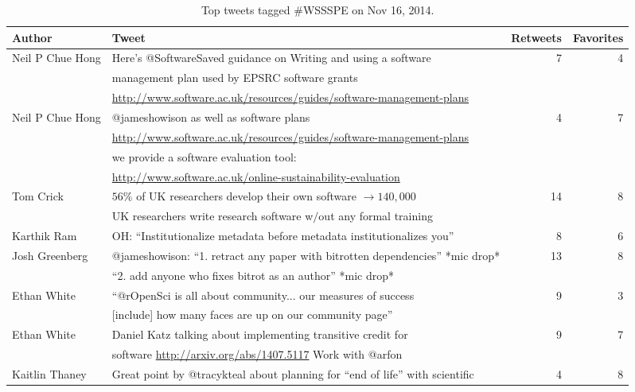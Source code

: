 \documentclass[11pt, oneside]{amsart}
\begin{document}
\begin{table*}[t]
\centering
\caption{Top tweets tagged \#WSSSPE on Nov 16, 2014.}\label{tab:tweets}
  \begin{scriptsize}
  \begin{tabular}{l|l|r|r}
 \hline
    Author  &   Tweet  & Retweets &  Favorites
\\ \hline
%
Neil P Chue Hong   &  Here's @SoftwareSaved guidance on Writing and using a software & 7 & 4
\\     &  management plan used by EPSRC software grants    &    &
\\     &  \url{http://www.software.ac.uk/resources/guides/software-management-plans}  &    &
%
\\  Neil P Chue Hong  &  @jameshowison as well as software plans   & 4 & 7
\\   &   \url{http://www.software.ac.uk/resources/guides/software-management-plans} &    &
\\   &   we provide a software evaluation tool:   &    &
\\   &   \url{http://www.software.ac.uk/online-sustainability-evaluation}  &    &
%
\\ Tom Crick  & $56\%$ of UK researchers develop their own software $\rightarrow  140,000$   &  14 & 8
\\ & UK researchers write research software w$/$out any formal training &    &
%
\\ Karthik Ram  &  OH: ``Institutionalize metadata before metadata institutionalizes you'' & 8 & 6
%
\\ Josh Greenberg  &  @jameshowison: ``1. retract any paper with bitrotten dependencies'' *mic drop* & 13 & 8
\\   &   ``2. add anyone who fixes bitrot as an author'' *mic drop*  &    &
%
\\ Ethan White &  ``@rOpenSci is all about community... our measures of success  & 9 & 3
\\ &   [include] how many faces are up on our community page''   &    &
%
\\ Ethan White & Daniel Katz talking about implementing transitive credit for  & 9 & 7
\\ &  software \url{http://arxiv.org/abs/1407.5117}  Work with @arfon  &    &
%
\\ Kaitlin Thaney  & Great point by @tracykteal about planning for ``end of life'' with scientific & 4 & 8

\end{tabular}
\end{scriptsize}
\end{table*}
\end{document}
